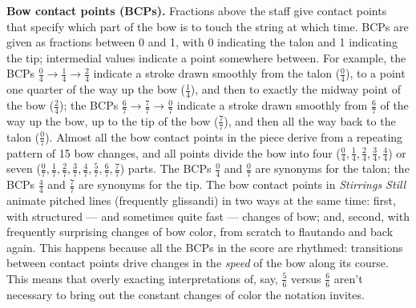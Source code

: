 \textbf{Bow contact points (BCPs).} Fractions above the staff give contact points that
specify which part of the bow is to touch the string at which time. BCPs are given as
fractions between 0 and 1, with 0 indicating the talon and 1 indicating the tip;
intermedial values indicate a point somewhere between. For example, the BCPs $\frac{0}{4}
\longrightarrow \frac{1}{4} \longrightarrow \frac{2}{4}$ indicate a stroke drawn smoothly
from the talon ($\frac{0}{4}$), to a point one quarter of the way up the bow
($\frac{1}{4}$), and then to exactly the midway point of the bow ($\frac{2}{4}$); the
BCPs $\frac{6}{7} \longrightarrow \frac{7}{7} \longrightarrow \frac{0}{7}$ indicate a
stroke drawn smoothly from $\frac{6}{7}$ of the way up the bow, up to the tip of the bow
($\frac{7}{7}$), and then all the way back to the talon ($\frac{0}{7}$). Almost all the
bow contact points in the piece derive from a repeating pattern of 15 bow changes, and
all points divide the bow into four ($\frac{0}{4}, \frac{1}{4}, \frac{2}{4}, \frac{3}{4},
\frac{4}{4}$) or seven ($\frac{0}{7}, \frac{1}{7}, \frac{2}{7}, \frac{3}{7}, \frac{4}{7},
\frac{5}{7}, \frac{6}{7}, \frac{7}{7}$) parts. The BCPs $\frac{0}{4}$ and $\frac{0}{7}$
are synonyms for the talon; the BCPs $\frac{4}{4}$ and $\frac{7}{7}$ are synonyms for the
tip. The bow contact points in \textit{Stirrings Still} animate pitched lines (frequently
glissandi) in two ways at the same time: first, with structured --- and sometimes quite
fast --- changes of bow; and, second, with frequently surprising changes of bow color,
from scratch to flautando and back again. This happens because all the BCPs in the score
are rhythmed: transitions between contact points drive changes in the \textit{speed} of
the bow along its course. This means that overly exacting interpretations of, say,
$\frac{5}{6}$ versus $\frac{6}{6}$ aren't necessary to bring out the constant changes of
color the notation invites.

